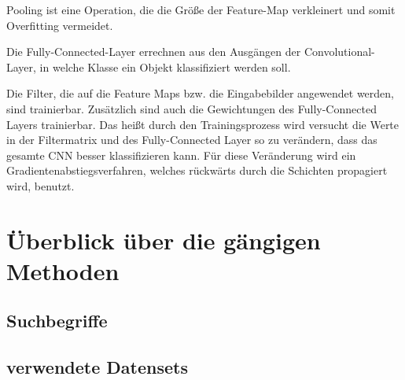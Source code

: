 Pooling ist eine Operation, die die Größe der Feature-Map verkleinert und somit Overfitting vermeidet.

Die Fully-Connected-Layer errechnen aus den Ausgängen der Convolutional-Layer, in welche Klasse ein Objekt klassifiziert werden soll.  

Die Filter, die auf die Feature Maps bzw. die Eingabebilder angewendet werden, sind trainierbar. Zusätzlich sind auch die Gewichtungen des Fully-Connected Layers trainierbar. Das heißt durch den Trainingsprozess wird versucht die Werte in der Filtermatrix und des Fully-Connected Layer so zu verändern, dass das gesamte CNN besser klassifizieren kann. Für diese Veränderung wird ein Gradientenabstiegsverfahren, welches rückwärts durch die Schichten propagiert wird, benutzt.


\section{Überblick über die gängigen Methoden}



\subsection{Suchbegriffe}



\subsection{verwendete Datensets}



